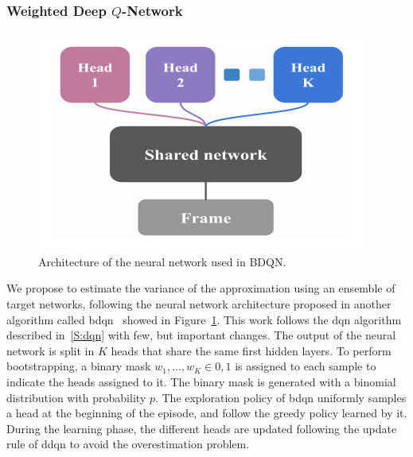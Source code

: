 \subsubsection{Weighted Deep $Q$-Network}\label{S:drl}
\begin{figure}[t]
\begin{center}
  \includegraphics[scale=.5]{img/bdqn.png}
\end{center}
\caption[Boostrapped DQN network]{Architecture of the neural network used in BDQN.}\label{F:bdqn-net}
\end{figure}
We propose to estimate the variance of the approximation using an ensemble of target networks, following the neural network architecture proposed in another algorithm called \gls{bdqn}~\cite{osband2017deep} showed in Figure~\ref{F:bdqn-net}. This work follows the \gls{dqn} algorithm described in~\ref{S:dqn} with few, but important changes. The output of the neural network is split in $K$ heads that share the same first hidden layers. To perform bootstrapping, a binary mask $w_1, \dots, w_K \in {0,1}$ is assigned to each sample to indicate the heads assigned to it. The binary mask is generated with a binomial distribution with probability $p$. The exploration policy of \gls{bdqn} uniformly samples a head at the beginning of the episode, and follow the greedy policy learned by it. During the learning phase, the different heads are updated following the update rule of \gls{ddqn} to avoid the overestimation problem.

